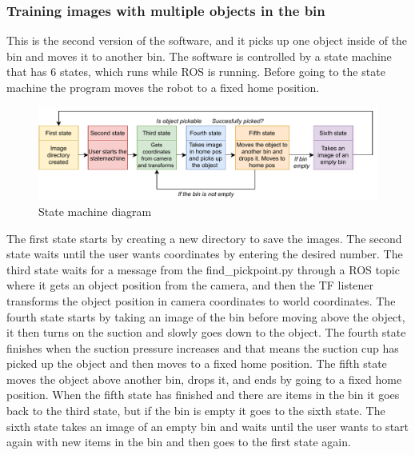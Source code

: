 \subsubsection{Training images with multiple objects in the bin}
This is the second version of the software, and it picks up one object inside of the bin and moves it to another bin.
The software is controlled by a state machine that has 6 states, which runs while ROS is running. Before going to the state machine the program moves the robot to a fixed home position. 

\vspace{1cm}
\begin{figure}[h]
 \centering
 \includegraphics[width=\textwidth]{graphics/statemachine.pdf}
 \caption{State machine diagram}
 \label{fig:statemachine}
\end{figure}

The first state starts by creating a new directory to save the images. 
The second state waits until the user wants coordinates by entering the desired number. 
The third state waits for a message from the find\_pickpoint.py through a ROS topic where it gets an object position from the camera, and then the TF listener transforms the object position in camera coordinates to world coordinates.
The fourth state starts by taking an image of the bin before moving above the object, it then turns on the suction and slowly goes down to the object. The fourth state finishes when the suction pressure increases and that means the suction cup has picked up the object and then moves to a fixed home position.
The fifth state moves the object above another bin, drops it, and ends by going to a fixed home position. When the fifth state has finished and there are items in the bin it goes back to the third state, but if the bin is empty it goes to the sixth state.
The sixth state takes an image of an empty bin and waits until the user wants to start
again with new items in the bin and then goes to the first state again. 


